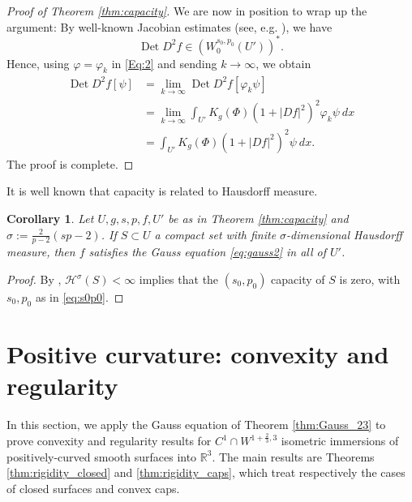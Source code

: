 \documentclass[12pt]{article}
\newcommand{\R}{\mathbb{R}}
\theoremstyle{plain}
\newtheorem{corollary}[theorem]{Corollary}
\numberwithin{equation}{section}
\begin{document}
\begin{proof}[Proof of Theorem \ref{thm:capacity}]
    We are now in position to wrap up the argument: By well-known Jacobian estimates (see, e.g. \cite[Proposition 1]{gladbach_olbermann}), we have
    \begin{equation}
        \operatorname{Det} D^2f \in (W^{s_0,p_0}_0(U'))^*.
    \end{equation}
    Hence, using $\varphi = \varphi_k$ in \eqref{Eq:2} and sending $k \rightarrow \infty$, we obtain
    \begin{align*}
        \operatorname{Det} D^2f [\psi] &= \lim_{k \to \infty} \operatorname{Det} D^2 f [\varphi_k \psi]\\
        &= \lim_{k \to \infty} \int_{U'} K_g(\Phi) (1+|Df|^2)^2 \varphi_k \psi~dx\\
        &= \int_{U'} K_g(\Phi) (1+|Df|^2)^2 \psi~ dx.
    \end{align*}
    The proof is complete.
\end{proof}
It is well known that capacity is related to Hausdorff measure. 
\begin{corollary} \label{cor:hausdorff}
    Let $U, g, s, p, f, U'$ be as in Theorem \ref{thm:capacity} and $\sigma := \frac2{p-2} (sp-2)$. If $S \subset U$ a compact set with finite $\sigma$-dimensional Hausdorff measure, then $f$ satisfies the Gauss equation \eqref{eq:gauss2} in all of $U'$.
\end{corollary}

\begin{proof}
    By {\cite[Theorem 5.1.9]{adams_hedberg}}, $\mathcal{H}^\sigma(S) < \infty$ implies that the $(s_0,p_0)$ capacity of $S$ is zero, with $s_0, p_0$ as in \eqref{eq:s0p0}.
\end{proof}

\section{Positive curvature: convexity and regularity} \label{sec:positive}

In this section, we apply the Gauss equation of Theorem \ref{thm:Gauss_23} to prove convexity and regularity results for $C^1 \cap W^{1+\frac23,3}$ isometric immersions of positively-curved smooth surfaces into $\R^3$. The main results are Theorems \ref{thm:rigidity_closed} and \ref{thm:rigidity_caps}, which treat respectively the cases of closed surfaces and convex caps. 
\end{document}
